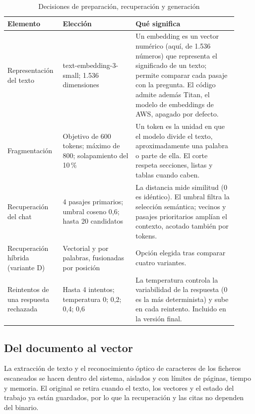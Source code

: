 \begin{table}[htbp]
\centering\small
\caption{Decisiones de preparación, recuperación y generación}\label{tab-e1}
\begin{tabular}{@{}p{0.2\linewidth}p{0.3\linewidth}p{0.42\linewidth}@{}}
\toprule
\textbf{Elemento} & \textbf{Elección} & \textbf{Qué significa} \\
\midrule
Representación del texto & text-embedding-3-small; 1.536 dimensiones & Un embedding es un vector numérico (aquí, de 1.536 números) que representa el significado de un texto; permite comparar cada pasaje con la pregunta. El código admite además Titan, el modelo de embeddings de AWS, apagado por defecto. \\
Fragmentación & Objetivo de 600 tokens; máximo de 800; solapamiento del 10\,\% & Un token es la unidad en que el modelo divide el texto, aproximadamente una palabra o parte de ella. El corte respeta secciones, listas y tablas cuando caben. \\
Recuperación del chat & 4 pasajes primarios; umbral coseno 0,6; hasta 20 candidatos & La distancia mide similitud (0 es idéntico). El umbral filtra la selección semántica; vecinos y pasajes prioritarios amplían el contexto, acotado también por tokens. \\
Recuperación híbrida (variante D) & Vectorial y por palabras, fusionadas por posición & Opción elegida tras comparar cuatro variantes. \\
Reintentos de una respuesta rechazada & Hasta 4 intentos; temperatura 0; 0,2; 0,4; 0,6 & La temperatura controla la variabilidad de la respuesta (0 es la más determinista) y sube en cada reintento. Incluido en la versión final. \\
\bottomrule
\end{tabular}
\end{table}


\subsection{Del documento al vector}\label{e-2}

La extracción de texto y el reconocimiento óptico de caracteres de los ficheros escaneados se hacen dentro del sistema, aislados y con límites de páginas, tiempo y memoria. El original se retira cuando el texto, los vectores y el estado del trabajo ya están guardados, por lo que la recuperación y las citas no dependen del binario. \cite{arquitectura}


